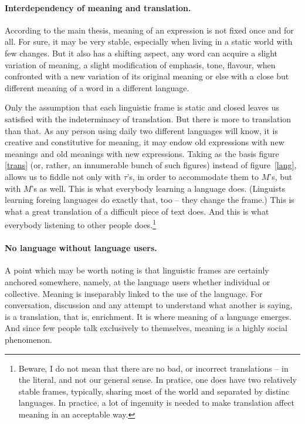 \documentclass[10pt]{article}
\newcommand{\<}{\langle}
\renewcommand{\>}{\rangle}
\begin{document}
\paragraph{Interdependency of meaning and translation.}
According to the main thesis, meaning of an expression is not fixed once 
and for all. For sure, it may be very stable, especially when living in a 
static world with few changes. But it also has a shifting aspect, any word 
can acquire a slight variation of meaning, a slight modification of 
emphasis, tone, flavour, when confronted with a new variation of its 
original meaning or else with a close but different meaning of a word in a 
different language. 

Only the assumption that each linguistic frame is static and closed leaves
us satisfied with the 
indeterminacy of translation. But there is more to translation 
than that. As any person using daily two different languages 
will know, it is creative and constitutive for meaning, it may endow old 
expressions with new meanings and old meanings with new expressions.
Taking as the basis figure \ref{trans} (or, rather, an innumerable bunch of such 
figures) instead of figure~\ref{lang}, allows us to fiddle not only with 
$\tau$'s, in order to accommodate them to $M$'s, but with $M$'s as well.
 This is what everybody learning a language does. (Linguists 
learning foreing languages do exactly that, too -- they change the frame.)
This is what a great translation of a difficult piece of text does.
And this is what everybody listening 
to other people does.\footnote{Beware, I do not mean that there are no bad, 
or incorrect translations -- in the literal, and not our general sense. 
In pratice, one does have two relatively stable 
frames, typically, sharing most of the world and separated by distinc 
languages. In practice, a lot of ingenuity is needed to make translation 
affect meaning in an acceptable way.} 

\paragraph{No language without language users.}
A point which may be worth noting is that linguistic frames are certainly 
anchored somewhere, namely, at the language users whether individual or 
collective. Meaning is inseparably linked to the use of the language. 
For conversation, discussion and any attempt to understand what another is 
saying, is a translation, that is, enrichment. It is where meaning of a 
language emerges. And since few people talk exclusively to 
themselves, meaning is a highly social phenomenon. 
\end{document}
